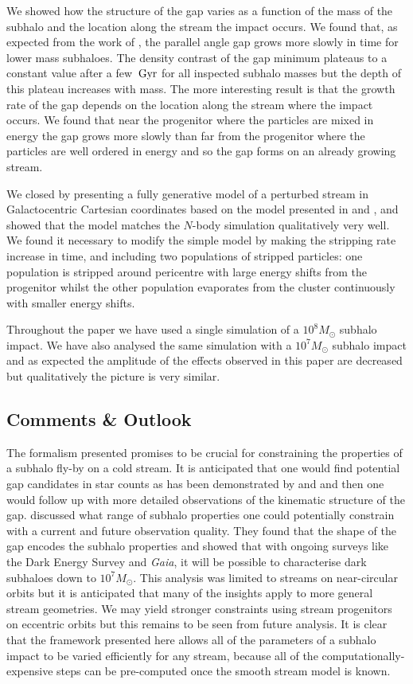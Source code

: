 \documentclass[useAMS,usenatbib,fleqn,a4paper]{mn2e}
\def\Gyr{\,{\rm Gyr}}
\begin{document}
We showed how the structure of the gap varies as a function of the mass of the subhalo and the location along the stream the impact occurs. We found that, as expected from the work of \cite{ErkalBelokurov2015}, the parallel angle gap grows more slowly in time for lower mass subhaloes. The density contrast of the gap minimum plateaus to a constant value after a few $\Gyr$ for all inspected subhalo masses but the depth of this plateau increases with mass. The more interesting result is that the growth rate of the gap depends on the location along the stream where the impact occurs. We found that near the progenitor where the particles are mixed in energy the gap grows more slowly than far from the progenitor where the particles are well ordered in energy and so the gap forms on an already growing stream.

We closed by presenting a fully generative model of a perturbed stream in Galactocentric Cartesian coordinates based on the model presented in \cite{Bovy2014} and \cite{Sanders2014}, and showed that the model matches the $N$-body simulation qualitatively very well. We found it necessary to modify the simple model by making the stripping rate increase in time, and including two populations of stripped particles: one population is stripped around pericentre with large energy shifts from the progenitor whilst the other population evaporates from the cluster continuously with smaller energy shifts.

Throughout the paper we have used a single simulation of a $10^8M_\odot$ subhalo impact. We have also analysed the same simulation with a $10^7M_\odot$ subhalo impact and as expected the amplitude of the effects observed in this paper are decreased but qualitatively the picture is very similar.

\subsection{Comments \& Outlook}

The formalism presented promises to be crucial for constraining the properties of a subhalo fly-by on a cold stream. It is anticipated that one would find potential gap candidates in star counts as has been demonstrated by \citet{CarlbergPal52012} and \citet{CarlbergGD12013} and then one would follow up with more detailed observations of the kinematic structure of the gap. \cite{ErkalBelokurov2015b} discussed what range of subhalo properties one could potentially constrain with a current and future observation quality. They found that the shape of the gap encodes the subhalo properties and showed that with ongoing surveys like the Dark Energy Survey and \textit{Gaia}, it will be possible to characterise dark subhaloes down to $10^7M_\odot$. This analysis was limited to streams on near-circular orbits but it is anticipated that many of the insights apply to more general stream geometries. We may yield stronger constraints using stream progenitors on eccentric orbits but this remains to be seen from future analysis. It is clear that the framework presented here allows all of the parameters of a subhalo impact to be varied efficiently for any stream, because all of the computationally-expensive steps can be pre-computed once the smooth stream model is known.
\end{document}

